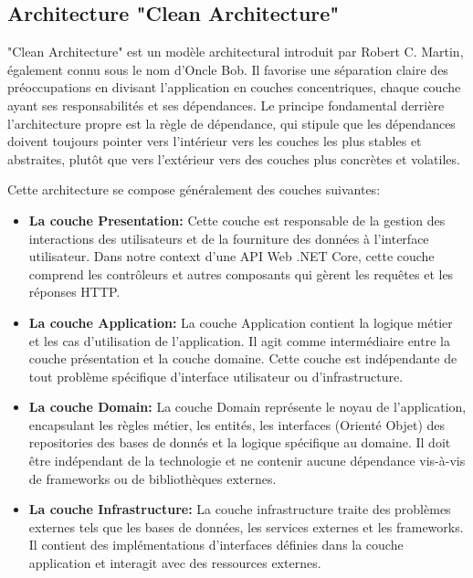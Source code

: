 \subsection{Architecture "Clean Architecture"}
\noindent
"Clean Architecture" est un modèle architectural introduit par Robert C. Martin, également connu sous le nom d'Oncle Bob. Il favorise une séparation claire des préoccupations en divisant l'application en couches concentriques, chaque couche ayant ses responsabilités et ses dépendances. Le principe fondamental derrière l'architecture propre est la règle de dépendance, qui stipule que les dépendances doivent toujours pointer vers l'intérieur vers les couches les plus stables et abstraites, plutôt que vers l'extérieur vers des couches plus concrètes et volatiles. 

\noindent
Cette architecture se compose généralement des couches suivantes: \\

\begin{itemize}
    \small\item \textbf{La couche Presentation: } Cette couche est responsable de la gestion des interactions des utilisateurs et de la fourniture des données à l'interface utilisateur. Dans notre context d'une API Web .NET Core, cette couche comprend les contrôleurs et autres composants qui gèrent les requêtes et les réponses HTTP.

    \small\item \textbf{La couche Application: } La couche Application contient la logique métier et les cas d’utilisation de l’application. Il agit comme intermédiaire entre la couche présentation et la couche domaine. Cette couche est indépendante de tout problème spécifique d’interface utilisateur ou d’infrastructure.
    \small\item \textbf{La couche Domain: } La couche Domain représente le noyau de l’application, encapsulant les règles métier, les entités, les interfaces (Orienté Objet) des repositories des bases de donnés et la logique spécifique au domaine. Il doit être indépendant de la technologie et ne contenir aucune dépendance vis-à-vis de frameworks ou de bibliothèques externes.

    \small\item \textbf{La couche Infrastructure: } La couche infrastructure traite des problèmes externes tels que les bases de données, les services externes et les frameworks. Il contient des implémentations d'interfaces définies dans la couche application et interagit avec des ressources externes.
\end{itemize}

